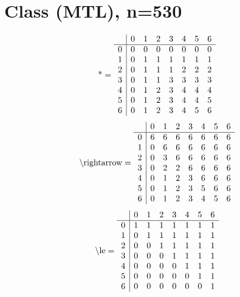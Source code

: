 \documentclass[11pt]{article}
\begin{document}
\section{Class (MTL), n=530}
\[\text{*} = 
\begin{array}{r | r r r r r r r}
 & 0 & 1 & 2 & 3 & 4 & 5 & 6 \\ \hline
0 & 0 & 0 & 0 & 0 & 0 & 0 & 0 \\
1 & 0 & 1 & 1 & 1 & 1 & 1 & 1 \\
2 & 0 & 1 & 1 & 1 & 2 & 2 & 2 \\
3 & 0 & 1 & 1 & 3 & 3 & 3 & 3 \\
4 & 0 & 1 & 2 & 3 & 4 & 4 & 4 \\
5 & 0 & 1 & 2 & 3 & 4 & 4 & 5 \\
6 & 0 & 1 & 2 & 3 & 4 & 5 & 6 \\
\end{array}
\]
\[\text{\textbackslash rightarrow} = 
\begin{array}{r | r r r r r r r}
 & 0 & 1 & 2 & 3 & 4 & 5 & 6 \\ \hline
0 & 6 & 6 & 6 & 6 & 6 & 6 & 6 \\
1 & 0 & 6 & 6 & 6 & 6 & 6 & 6 \\
2 & 0 & 3 & 6 & 6 & 6 & 6 & 6 \\
3 & 0 & 2 & 2 & 6 & 6 & 6 & 6 \\
4 & 0 & 1 & 2 & 3 & 6 & 6 & 6 \\
5 & 0 & 1 & 2 & 3 & 5 & 6 & 6 \\
6 & 0 & 1 & 2 & 3 & 4 & 5 & 6 \\
\end{array}
\]
\[\text{\textbackslash le} = 
\begin{array}{r | r r r r r r r}
 & 0 & 1 & 2 & 3 & 4 & 5 & 6 \\ \hline
0 & 1 & 1 & 1 & 1 & 1 & 1 & 1 \\
1 & 0 & 1 & 1 & 1 & 1 & 1 & 1 \\
2 & 0 & 0 & 1 & 1 & 1 & 1 & 1 \\
3 & 0 & 0 & 0 & 1 & 1 & 1 & 1 \\
4 & 0 & 0 & 0 & 0 & 1 & 1 & 1 \\
5 & 0 & 0 & 0 & 0 & 0 & 1 & 1 \\
6 & 0 & 0 & 0 & 0 & 0 & 0 & 1 \\
\end{array}
\]
\end{document}
